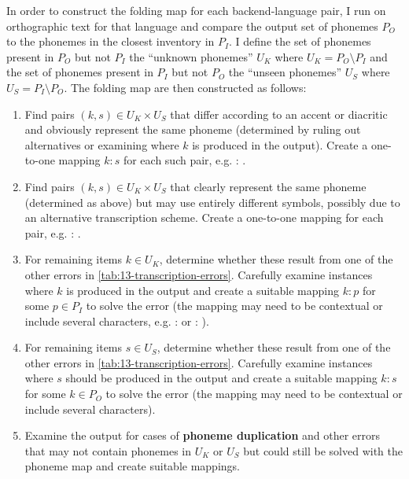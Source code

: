 In order to construct the folding map for each backend-language pair, I run \gpp on orthographic text for that language and compare the output set of phonemes $P_O$ to the phonemes in the closest inventory in \phoible $P_I$. I define the set of phonemes present in $P_O$ but not $P_I$ the ``unknown phonemes'' $U_K$ where $U_K = P_O \setminus P_I $ and the set of phonemes present in $P_I$ but not $P_O$ the ``unseen phonemes'' $U_S$ where $U_S = P_I \setminus P_O $. The folding map are then constructed as follows:
\begin{enumerate}
    \item Find pairs $(k,s) \in U_K \times U_S$ that differ according to an accent or diacritic and obviously represent the same phoneme (determined by ruling out alternatives or examining where $k$ is produced in the output). Create a one-to-one mapping $k:s$ for each such pair, e.g.  : .
    \item Find pairs $(k,s) \in U_K \times U_S$ that clearly represent the same phoneme (determined as above) but may use entirely different symbols, possibly due to an alternative transcription scheme. Create a one-to-one mapping for each pair, e.g.  : \ttipa{\ae}.
    \item For remaining items $k \in U_K$, determine whether these result from one of the other errors in \cref{tab:13-transcription-errors}. Carefully examine instances where $k$ is produced in the output and create a suitable mapping $k : p$ for some $p \in P_I$ to solve the error (the mapping may need to be contextual or include several characters, e.g. \ttipa{\textrhookschwa} :  or  : ). 
    \item For remaining items $s \in U_S$, determine whether these result from one of the other errors in \cref{tab:13-transcription-errors}. Carefully examine instances where $s$ should be produced in the output and create a suitable mapping $k : s$ for some $k \in P_O$ to solve the error (the mapping may need to be contextual or include several characters). 
    \item Examine the output for cases of \textbf{phoneme duplication} and other errors that may not contain phonemes in $U_K$ or $U_S$ but could still be solved with the phoneme map and create suitable mappings.
\end{enumerate}

